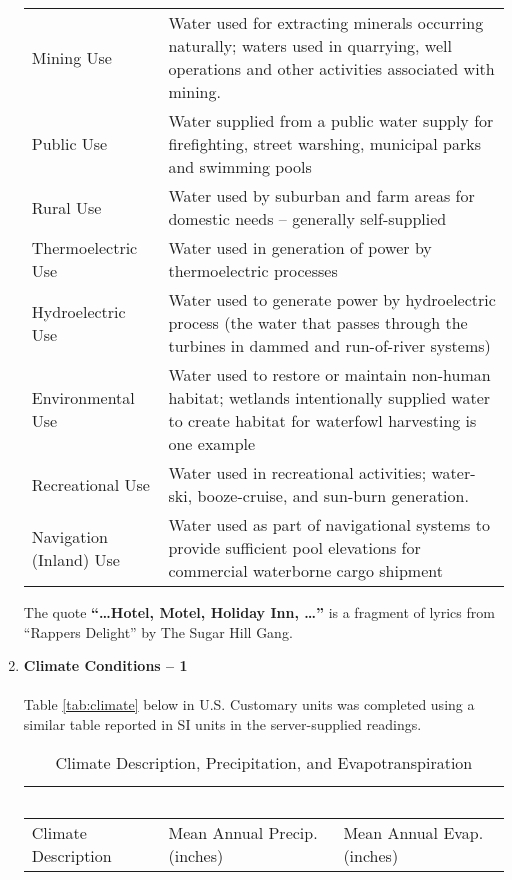 \documentclass[12pt]{article}
\begin{document}
\begin{enumerate}
\begin{table}[h!]
\begin{tabular}{p{1.7in}p{4.3in}}
Mining Use & Water used for extracting minerals occurring naturally; waters used in quarrying, well operations and other activities associated with mining.\\
Public Use & Water supplied from a public water supply for firefighting, street warshing, municipal parks and swimming pools\\
Rural Use & Water used by suburban and farm areas for domestic needs -- generally self-supplied\\
Thermoelectric Use & Water used in generation of power by thermoelectric processes \\
Hydroelectric Use & Water used to generate power by hydroelectric process (the water that passes through the turbines in dammed and run-of-river systems) \\
Environmental Use & Water used to restore or maintain non-human habitat; wetlands intentionally supplied water to create habitat for waterfowl harvesting is one example\\

Recreational Use & Water used in recreational activities; water-ski, booze-cruise, and sun-burn generation.  \\

Navigation (Inland) Use & Water used as part of navigational systems to provide sufficient pool elevations for commercial waterborne cargo shipment\\

\hline
\hline
   \end{tabular}
   \label{tab:water-use}
\end{table}
The quote \textbf{``\dots Hotel, Motel, Holiday Inn, \dots''} is a fragment of lyrics from ``Rappers Delight'' by The Sugar Hill Gang.
\clearpage
\item{{\textbf{Climate Conditions -- 1}}}~\\~\\
Table \ref{tab:climate} below in U.S. Customary units was completed using a similar table reported in SI units in the server-supplied readings.
\begin{table}[htbp]
   \centering
   \caption{Climate Description, Precipitation, and Evapotranspiration}
   \begin{tabular}{p{1.5in}p{2.25in}p{2.25in}} %
   ~ & ~ & ~\\
\hline \hline
Climate Description & Mean Annual Precip. (inches) & Mean Annual Evap. (inches) \\
\hline


\end{tabular}
\end{table}
\end{enumerate}
\end{document}
